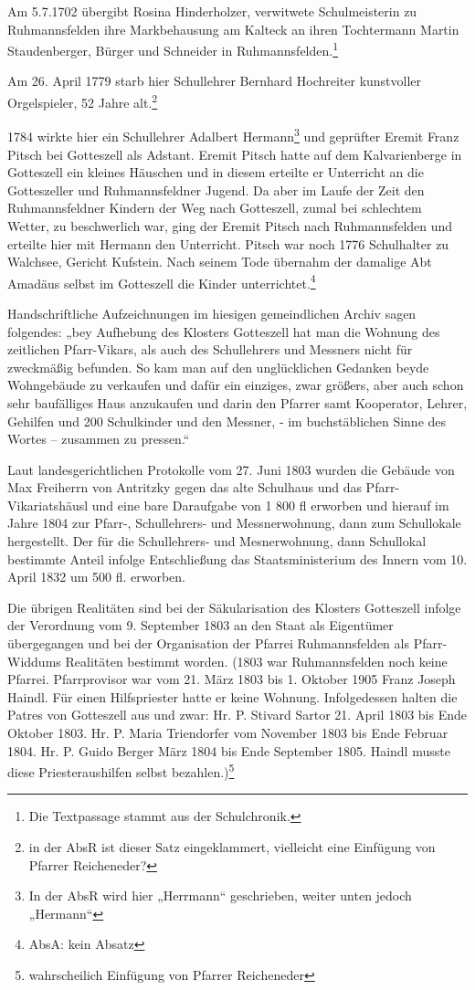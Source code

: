 \documentclass[12pt,a4paper]{book}
\begin{document}
Am 5.7.1702 übergibt Rosina Hinderholzer, verwitwete Schulmeisterin zu
Ruhmannsfelden ihre Markbehausung am Kalteck an ihren Tochtermann Martin
Staudenberger, Bürger und Schneider in Ruhmannsfelden.\footnote{Die Textpassage
stammt aus der Schulchronik.}

Am 26. April 1779 starb hier Schullehrer Bernhard Hochreiter kunstvoller
Orgelspieler, 52 Jahre alt.\footnote{in der AbsR ist dieser Satz eingeklammert,
vielleicht eine Einfügung von Pfarrer Reicheneder?}

1784 wirkte hier ein Schullehrer Adalbert Hermann\footnote{In der AbsR wird hier
„Herrmann“ geschrieben, weiter unten jedoch „Hermann“} und geprüfter Eremit
Franz Pitsch bei Gotteszell als Adstant. Eremit Pitsch hatte auf dem
Kalvarienberge in Gotteszell ein kleines Häuschen und in diesem erteilte er
Unterricht an die Gotteszeller und Ruhmannsfeldner Jugend. Da aber im Laufe der
Zeit den Ruhmannsfeldner Kindern der Weg nach Gotteszell, zumal bei schlechtem
Wetter, zu beschwerlich war, ging der Eremit Pitsch nach Ruhmannsfelden und
erteilte hier mit Hermann den Unterricht. Pitsch war noch 1776 Schulhalter zu
Walchsee, Gericht Kufstein. Nach seinem Tode übernahm der damalige Abt Amadäus
selbst im Gotteszell die Kinder unterrichtet.\footnote{AbsA: kein Absatz}

Handschriftliche Aufzeichnungen im hiesigen gemeindlichen Archiv sagen
folgendes: „bey Aufhebung des Klosters Gotteszell hat man die Wohnung des
zeitlichen Pfarr-Vikars, als auch des Schullehrers und Messners nicht für
zweckmäßig befunden. So kam man auf den unglücklichen Gedanken beyde Wohngebäude
zu verkaufen und dafür ein einziges, zwar größers, aber auch schon sehr
baufälliges Haus anzukaufen und darin den Pfarrer samt Kooperator, Lehrer,
Gehilfen und 200 Schulkinder und den Messner, - im buchstäblichen Sinne des
Wortes – zusammen zu pressen.“

Laut landesgerichtlichen Protokolle vom 27. Juni 1803 wurden die Gebäude von Max
Freiherrn von Antritzky gegen das alte Schulhaus und das Pfarr-Vikariatshäusl
und eine bare Daraufgabe von 1 800 fl erworben und hierauf im Jahre 1804 zur
Pfarr-, Schullehrers- und Messnerwohnung, dann zum Schullokale hergestellt. Der
für die Schullehrers- und Mesnerwohnung, dann Schullokal bestimmte Anteil
infolge Entschließung das Staatsministerium des Innern vom 10. April 1832 um 500
fl. erworben.

Die übrigen Realitäten sind bei der Säkularisation des Klosters Gotteszell
infolge der Verordnung vom 9. September 1803 an den Staat als Eigentümer
übergegangen und bei der Organisation der Pfarrei Ruhmannsfelden als
Pfarr-Widdums Realitäten bestimmt worden. (1803 war Ruhmannsfelden noch keine
Pfarrei. Pfarrprovisor war vom 21. März 1803 bis 1. Oktober 1905 Franz Joseph
Haindl. Für einen Hilfspriester hatte er keine Wohnung. Infolgedessen halten die
Patres von Gotteszell aus und zwar: Hr. P. Stivard Sartor 21. April 1803 bis
Ende Oktober 1803. Hr. P. Maria Triendorfer vom November 1803 bis Ende Februar
1804. Hr. P. Guido Berger März 1804 bis Ende September 1805. Haindl musste diese
Priesteraushilfen selbst bezahlen.)\footnote{wahrscheilich Einfügung von Pfarrer
Reicheneder}
\end{document}
